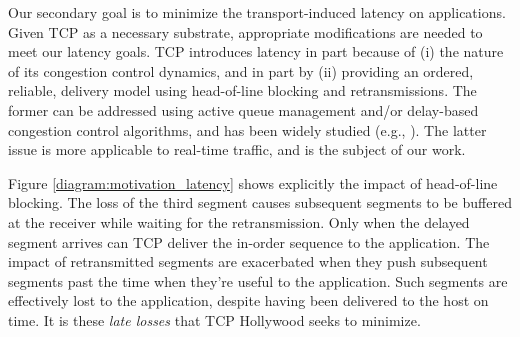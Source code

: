 



Our secondary goal is to minimize the transport-induced latency on applications.
Given TCP as a necessary substrate, appropriate modifications are needed to meet
our latency goals. TCP introduces latency in part because of (i) the nature of
its congestion control dynamics, and in part by (ii) providing an ordered,
reliable, delivery model using head-of-line blocking and retransmissions. The
former can be addressed using active queue management and/or delay-based
congestion control algorithms, and has been widely studied (e.g., 
\cite{nichols:2012:codel,khademi:2014:new-aqm,brakmo:1994:tcp-vegas}). The
latter issue is more applicable to real-time traffic, and is the subject of our
work.

Figure \ref{diagram:motivation_latency} shows explicitly the impact of
head-of-line blocking. The loss of the third segment causes subsequent segments
to be buffered at the receiver while waiting for the retransmission. Only when
the delayed segment arrives can TCP deliver the in-order sequence to the
application. The impact of retransmitted segments are exacerbated when they push
subsequent segments past the time when they're useful to the
application. Such segments are effectively lost to the application, despite
having been delivered to the host on time. It is these \emph{late losses} that
TCP Hollywood seeks to minimize.

